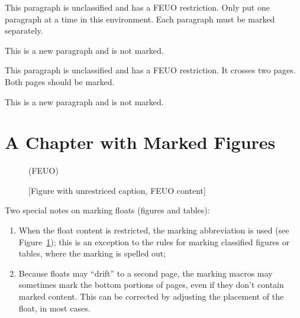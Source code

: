\begin{smark}[(FEUO)]
This paragraph is unclassified and has a FEUO restriction.
Only put one paragraph at a time in this environment.
Each paragraph must be marked separately.
\lipsum[2]
\end{smark}

This is a new paragraph and is not marked.
\lipsum[3]

\newpage
\lipsum[1-3]

\begin{smark}[(FEUO)]
This paragraph is unclassified and has a FEUO restriction.
It crosses two pages. Both pages should be marked.
\lipsum[4]
\end{smark}

This is a new paragraph and is not marked.
\lipsum[3]

\newpage
\section{A Chapter with Marked Figures}
\lipsum[1-4]

\begin{figure}
\begin{smarkenv}{(FEUO)}
\framebox[\textwidth]{\parbox{\textwidth}{\lipsum[1]}}
\end{smarkenv}
\caption{[Figure with unrestriced caption, FEUO content]}\label{fig:mark}
\end{figure}

Two special notes on marking floats (figures and tables):
\begin{enumerate}
\item When the float content is restricted, the marking abbreviation is
used (see Figure~\ref{fig:mark}); this is an exception
to the rules for marking classified figures or tables, where the
marking is spelled out;
\item Because floats may ``drift'' to a second
page, the marking macros may sometimes mark the bottom portions
of pages, even if they don't contain marked content. This can
be corrected by adjusting the placement of the float, in most
cases.
\end{enumerate}